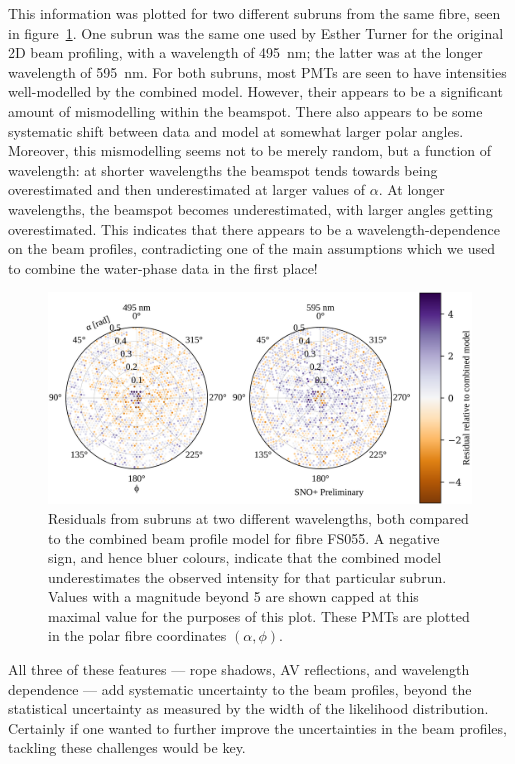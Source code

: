 This information was plotted for two different subruns from the same fibre, seen in figure~\ref{fig:llr}. One subrun was the same one used by Esther Turner for the original 2D beam profiling, with a wavelength of \SI{495}{\nano\metre}; the latter was at the longer wavelength of \SI{595}{\nano\metre}. For both subruns, most PMTs are seen to have intensities well-modelled by the combined model. However, their appears to be a significant amount of mismodelling within the beamspot. There also appears to be some systematic shift between data and model at somewhat larger polar angles. Moreover, this mismodelling seems not to be merely random, but a function of wavelength: at shorter wavelengths the beamspot tends towards being overestimated and then underestimated at larger values of $\alpha$. At longer wavelengths, the beamspot becomes underestimated, with larger angles getting overestimated. This indicates that there appears to be a wavelength-dependence on the beam profiles, contradicting one of the main assumptions which we used to combine the water-phase data in the first place!
\begin{figure}
    \centering
    \includegraphics[width=\textwidth]{5_SMELLIESimulation/images/residual_wavelength_comparison_data_model_nice.pdf}
    \caption{Residuals from subruns at two different wavelengths, both compared to the combined beam profile model for fibre FS055. A negative sign, and hence bluer colours, indicate that the combined model underestimates the observed intensity for that particular subrun. Values with a magnitude beyond 5 are shown capped at this maximal value for the purposes of this plot. These PMTs are plotted in the polar fibre coordinates $(\alpha,\phi)$.}
    \label{fig:llr}
\end{figure}
All three of these features --- rope shadows, AV reflections, and wavelength dependence --- add systematic uncertainty to the beam profiles, beyond the statistical uncertainty as measured by the width of the likelihood distribution. Certainly if one wanted to further improve the uncertainties in the beam profiles, tackling these challenges would be key.
